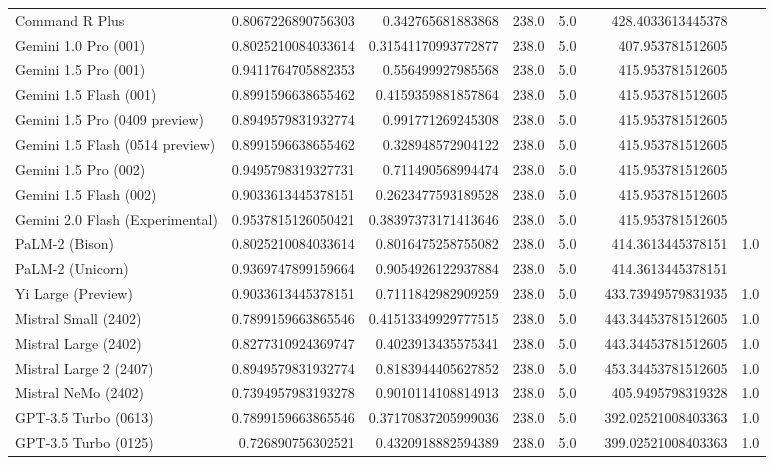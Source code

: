 \begin{table}[htp]
{\begin{tabular}{lrrrrrrr}
Command R Plus & 0.8067226890756303 & 0.342765681883868 & 238.0 & 5.0 &  & 428.4033613445378 &  \\
Gemini 1.0 Pro (001) & 0.8025210084033614 & 0.31541170993772877 & 238.0 & 5.0 &  & 407.953781512605 &  \\
Gemini 1.5 Pro (001) & 0.9411764705882353 & 0.556499927985568 & 238.0 & 5.0 &  & 415.953781512605 &  \\
Gemini 1.5 Flash (001) & 0.8991596638655462 & 0.4159359881857864 & 238.0 & 5.0 &  & 415.953781512605 &  \\
Gemini 1.5 Pro (0409 preview) & 0.8949579831932774 & 0.991771269245308 & 238.0 & 5.0 &  & 415.953781512605 &  \\
Gemini 1.5 Flash (0514 preview) & 0.8991596638655462 & 0.328948572904122 & 238.0 & 5.0 &  & 415.953781512605 &  \\
Gemini 1.5 Pro (002) & 0.9495798319327731 & 0.711490568994474 & 238.0 & 5.0 &  & 415.953781512605 &  \\
Gemini 1.5 Flash (002) & 0.9033613445378151 & 0.2623477593189528 & 238.0 & 5.0 &  & 415.953781512605 &  \\
Gemini 2.0 Flash (Experimental) & 0.9537815126050421 & 0.38397373171413646 & 238.0 & 5.0 &  & 415.953781512605 &  \\
PaLM-2 (Bison) & 0.8025210084033614 & 0.8016475258755082 & 238.0 & 5.0 &  & 414.3613445378151 & 1.0 \\
PaLM-2 (Unicorn) & 0.9369747899159664 & 0.9054926122937884 & 238.0 & 5.0 &  & 414.3613445378151 &  \\
Yi Large (Preview) & 0.9033613445378151 & 0.7111842982909259 & 238.0 & 5.0 &  & 433.73949579831935 & 1.0 \\
Mistral Small (2402) & 0.7899159663865546 & 0.41513349929777515 & 238.0 & 5.0 &  & 443.34453781512605 & 1.0 \\
Mistral Large (2402) & 0.8277310924369747 & 0.4023913435575341 & 238.0 & 5.0 &  & 443.34453781512605 & 1.0 \\
Mistral Large 2 (2407) & 0.8949579831932774 & 0.8183944405627852 & 238.0 & 5.0 &  & 453.34453781512605 & 1.0 \\
Mistral NeMo (2402) & 0.7394957983193278 & 0.9010114108814913 & 238.0 & 5.0 &  & 405.9495798319328 & 1.0 \\
GPT-3.5 Turbo (0613) & 0.7899159663865546 & 0.37170837205999036 & 238.0 & 5.0 &  & 392.02521008403363 & 1.0 \\
GPT-3.5 Turbo (0125) & 0.726890756302521 & 0.4320918882594389 & 238.0 & 5.0 &  & 399.02521008403363 & 1.0 \\

\end{tabular}}
\end{table}
